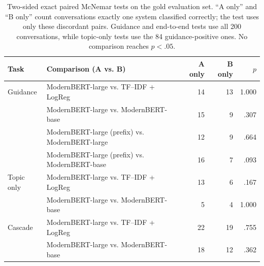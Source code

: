 \begin{table}[H]
\centering
\scriptsize
\setlength{\tabcolsep}{5pt}
\begin{tabular}{llrrr}
\toprule
Task & Comparison (A vs. B) & A only & B only & $p$ \\
\midrule
Guidance & ModernBERT-large vs. TF--IDF + LogReg & 14 & 13 & 1.000 \\
 & ModernBERT-large vs. ModernBERT-base & 15 & 9 & .307 \\
 & ModernBERT-large (prefix) vs. ModernBERT-large & 12 & 9 & .664 \\
 & ModernBERT-large (prefix) vs. ModernBERT-base & 16 & 7 & .093 \\
Topic only & ModernBERT-large vs. TF--IDF + LogReg & 13 & 6 & .167 \\
 & ModernBERT-large vs. ModernBERT-base & 5 & 4 & 1.000 \\
Cascade & ModernBERT-large vs. TF--IDF + LogReg & 22 & 19 & .755 \\
 & ModernBERT-large vs. ModernBERT-base & 18 & 12 & .362 \\
\bottomrule
\end{tabular}
\caption{Two-sided exact paired McNemar tests on the gold evaluation set. ``A only'' and ``B only'' count conversations exactly one system classified correctly; the test uses only these discordant pairs. Guidance and end-to-end tests use all 200 conversations, while topic-only tests use the 84 guidance-positive ones. No comparison reaches $p < .05$.}
\label{tab:gold-significance}
\end{table}
